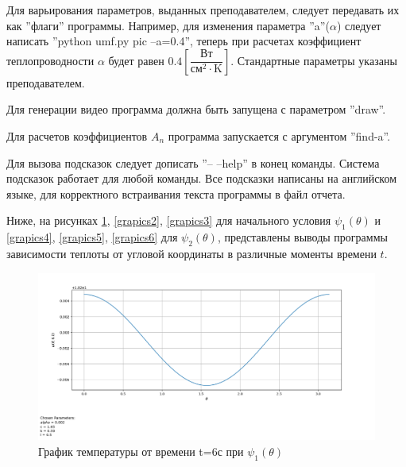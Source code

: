 {{Для варьирования параметров, выданных преподавателем, следует передавать их как ''флаги'' программы.
Например, для изменения параметра ''a''($\alpha$) следует написать ''python umf.py pic --a=0.4'', теперь при расчетах
коэффициент теплопроводности $\alpha$ будет равен $0.4\left[\dfrac{\text{Вт}}{\text{см}^2 \cdot \text{K}}\right]$.
Стандартные параметры указаны преподавателем.

Для генерации видео программа должна быть запущена с параметром ''draw''.

Для расчетов коэффициентов $A_n$ программа запускается с аргументом ''find-a''.

Для вызова подсказок следует дописать ''-- --help'' в конец команды. Система подсказок работает для любой команды.
Все подсказки написаны на английском языке, для корректного встраивания текста программы в файл отчета.

Ниже, на рисунках \ref{grapics1}, \ref{grapics2}, \ref{grapics3} для начального условия $\psi_1(\theta)$ и \ref{grapics4}, \ref{grapics5}, \ref{grapics6} для $\psi_2(\theta)$, представлены выводы программы зависимости теплоты от угловой координаты в различные моменты времени $t$.


\begin{figure}[H]
    \centering                             
	\includegraphics[width=\textwidth,height=\textheight,keepaspectratio]{kir/var_1_t_6.png}                 
	\centering\caption{ График температуры от времени t=6с при $\psi_1(\theta)$}
	\label{grapics1}                           
\end{figure}               

}}
